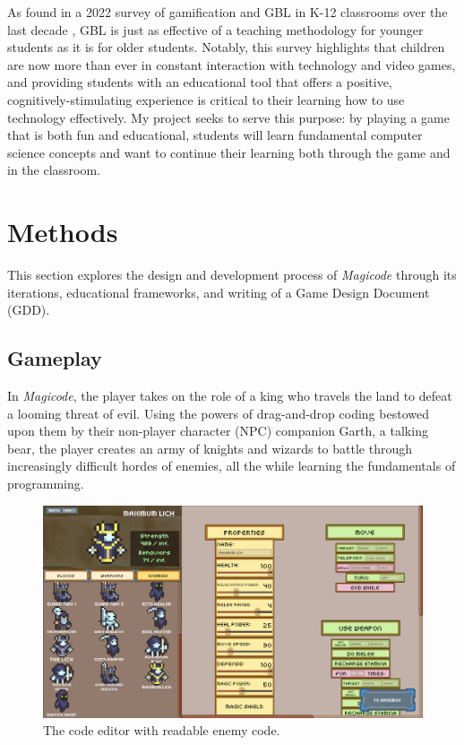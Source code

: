 \documentclass[10pt,twocolumn]{article}
\begin{document}
As found in a 2022 survey of gamification and GBL in K-12 classrooms over the last decade \cite{guan-gbl}, GBL is just as effective of a teaching methodology for younger students as it is for older students. Notably, this survey highlights that children are now more than ever in constant interaction with technology and video games, and providing students with an educational tool that offers a positive, cognitively-stimulating experience is critical to their learning how to use technology effectively. My project seeks to serve this purpose: by playing a game that is both fun and educational, students will learn fundamental computer science concepts and want to continue their learning both through the game and in the classroom.



\section{Methods}
This section explores the design and development process of \textit{Magicode} through its iterations, educational frameworks, and writing of a Game Design Document (GDD).


\subsection{Gameplay}
In \textit{Magicode}, the player takes on the role of a king who travels the land to defeat a looming threat of evil. Using the powers of drag-and-drop coding bestowed upon them by their non-player character (NPC) companion Garth, a talking bear, the player creates an army of knights and wizards to battle through increasingly difficult hordes of enemies, all the while learning the fundamentals of programming.

\begin{figure}
    \centering
    \includegraphics[width=\linewidth]{images/screenshots/lich_editor.png}
    \caption{The code editor with readable enemy code.}
    \label{fig:enemy-screenshot}
\end{figure}
\end{document}
